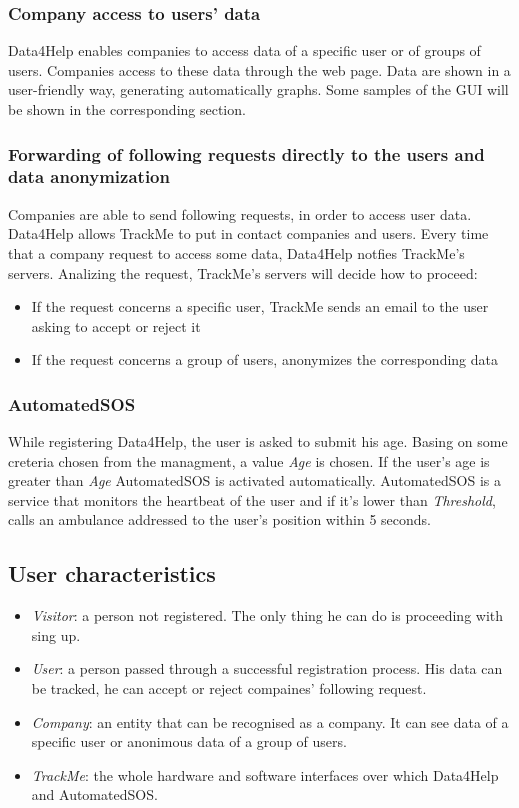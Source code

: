 \documentclass{article}
\begin{document}
\subsubsection{Company access to users' data}
Data4Help enables companies to access data of a specific user or of groups of users. Companies access to these data through the web page. Data are shown in a user-friendly way, generating automatically graphs. Some samples of the GUI will be shown in the corresponding section.
\subsubsection{Forwarding of following requests directly to the users and data anonymization}
Companies are able to send following requests, in order to access user data. Data4Help allows TrackMe to put in contact companies and users. Every time that a company request to access some data, Data4Help notfies TrackMe's servers. Analizing the request, TrackMe's servers will decide how to proceed:\\
\begin{itemize}
\item If the request concerns a specific user, TrackMe sends an email to the user asking to accept or reject it
\item If the request concerns a group of users, anonymizes the corresponding data 
\end{itemize}
\subsubsection{AutomatedSOS}
While registering Data4Help, the user is asked to submit his age. Basing on some creteria chosen from the managment, a value \emph{Age} is chosen. If the user's age is greater than \emph{Age} AutomatedSOS is activated automatically. AutomatedSOS is a service that monitors the heartbeat of the user and if it's lower than \emph{Threshold}, calls an ambulance addressed to the user's position within 5 seconds.
\subsection{User characteristics}
\begin{itemize}
\item \emph{Visitor}: a person not registered. The only thing he can do is proceeding with sing up.
\item \emph{User}: a person passed through a successful registration process. His data can be tracked, he can accept or reject compaines' following request.
 \item \emph{Company}: an entity that can be recognised as a company. It can see data of a specific user or anonimous data of a group of users. 
 \item \emph{TrackMe}: the whole hardware and software interfaces over which Data4Help and AutomatedSOS.
\end{itemize}
\end{document}
